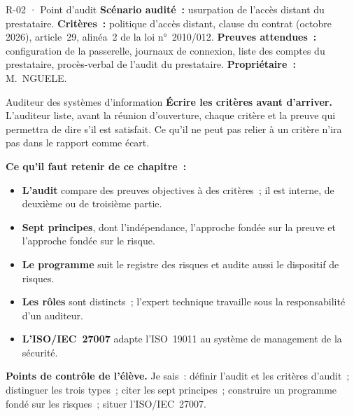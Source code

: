 \begin{boxobjet}{R-02 · Point d'audit}
\textbf{Scénario audité~:} usurpation de l'accès distant du prestataire.
\textbf{Critères~:} politique d'accès distant, clause du contrat
(octobre 2026), article~29, alinéa~2 de la loi n°~2010/012.
\textbf{Preuves attendues~:} configuration de la passerelle, journaux de
connexion, liste des comptes du prestataire, procès-verbal de l'audit du
prestataire. \textbf{Propriétaire~:} M.~NGUELE.
\end{boxobjet}

\begin{boxmetier}{Auditeur des systèmes d'information}
\textbf{Écrire les critères avant d'arriver.} L'auditeur liste, avant la
réunion d'ouverture, chaque critère et la preuve qui permettra de dire s'il
est satisfait. Ce qu'il ne peut pas relier à un critère n'ira pas dans le
rapport comme écart.
\end{boxmetier}

\separateur

\begin{boxresume}
\textbf{Ce qu'il faut retenir de ce chapitre~:}
\begin{itemize}
    \item \textbf{L'audit} compare des preuves objectives à des critères~;
          il est interne, de deuxième ou de troisième partie.
    \item \textbf{Sept principes}, dont l'indépendance, l'approche fondée
          sur la preuve et l'approche fondée sur le risque.
    \item \textbf{Le programme} suit le registre des risques et audite aussi
          le dispositif de risques.
    \item \textbf{Les rôles} sont distincts~; l'expert technique travaille
          sous la responsabilité d'un auditeur.
    \item \textbf{L'ISO/IEC~27007} adapte l'ISO~19011 au système de
          management de la sécurité.
\end{itemize}
\end{boxresume}

\begin{boxinfo}
\textbf{Points de contrôle de l'élève.} Je sais~: définir l'audit et les
critères d'audit~; distinguer les trois types~; citer les sept principes~;
construire un programme fondé sur les risques~; situer l'ISO/IEC~27007.
\end{boxinfo}

\bigskip


